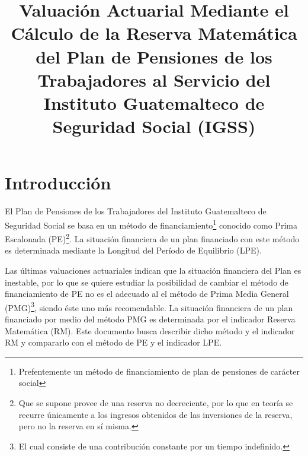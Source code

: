 \documentclass[12pt,letterpaper,titlepage]{article}
\title{Valuación Actuarial Mediante el Cálculo de la Reserva Matemática del Plan de Pensiones de los Trabajadores al Servicio del Instituto Guatemalteco de Seguridad Social (IGSS)}
\begin{document}
	{\onehalfspacing
\begin{titlepage}
	\renewcommand{\thepage}{}
	\pagestyle{empty}
	\maketitle
\end{titlepage}\newpage
\setcounter{page}{2}
\tableofcontents
\newpage
\nocite{*}
\section{Introducción}

El Plan de Pensiones de los Trabajadores del Instituto Guatemalteco de Seguridad Social se basa en un método de  financiamiento\footnote{Prefentemente un método de financiamiento de plan de pensiones de carácter social} conocido como Prima Escalonada (PE)\footnote{Que se supone provee de una reserva no decreciente, por lo que en teoría se recurre únicamente a los ingresos obtenidos de las inversiones de la reserva, pero no la reserva en sí misma.}. La situación financiera de un plan financiado con este método es determinada mediante la Longitud del Período de Equilibrio (LPE).\bigskip

Las últimas valuaciones actuariales indican que la situación
financiera del Plan es inestable, por lo que se quiere estudiar la posibilidad de cambiar el método de financiamiento de PE no es el adecuado al el método de Prima Media General (PMG)\footnote{El cual consiste de una contribución constante por un tiempo indefinido.}, siendo éste uno más recomendable. La situación financiera de un plan financiado por medio del método PMG es determinada por el indicador Reserva Matemática (RM). Este documento busca describir dicho método y el indicador RM y compararlo con el método de PE y el indicador LPE.\bigskip



}
\end{document}
